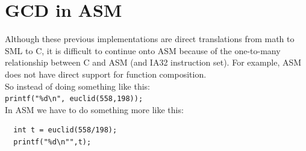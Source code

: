 \documentclass{article}
\begin{document}
\clearpage
\section{GCD in ASM}
\par Although these previous implementations are direct translations from math to SML to C, it is difficult to continue onto ASM because of the one-to-many relationship between C and ASM (and IA32 instruction set). For example, ASM does not have direct support for function composition. \\
So instead of doing something like this: \\
\verb|printf("%d\n", euclid(558,198));| \\
In ASM we have to do something more like this:
\begin{verbatim}
  int t = euclid(558/198);
  printf("%d\n"",t);
\end{verbatim}
\end{document}
